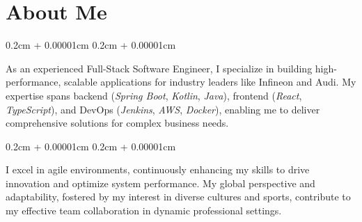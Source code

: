 \documentclass[11pt, letterpaper]{article}
\newenvironment{onecolentry}{
    \begin{adjustwidth}{
        0.2cm + 0.00001cm
    }{
        0.2cm + 0.00001cm
    }
}{
    \end{adjustwidth}
}
\begin{document}

    \section{About Me}
\begin{onecolentry}
    As an experienced Full-Stack Software Engineer, I specialize in building high-performance, scalable applications for industry leaders like Infineon and Audi. My expertise spans backend (\textit{Spring Boot}, \textit{Kotlin}, \textit{Java}), frontend (\textit{React}, \textit{TypeScript}), and DevOps (\textit{Jenkins}, \textit{AWS}, \textit{Docker}), enabling me to deliver comprehensive solutions for complex business needs.
\end{onecolentry}
\vspace{0.3 cm}
\begin{onecolentry}
    I excel in agile environments, continuously enhancing my skills to drive innovation and optimize system performance. My global perspective and adaptability, fostered by my interest in diverse cultures and sports, contribute to my effective team collaboration in dynamic professional settings.
\end{onecolentry}
\end{document}
